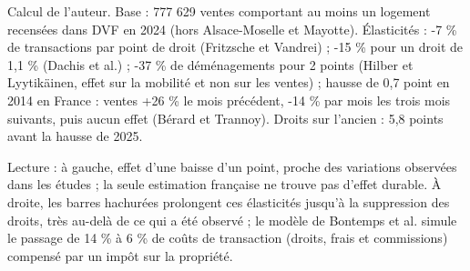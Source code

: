 Calcul de l'auteur. Base : 777 629 ventes comportant au moins un logement recensées dans DVF en 2024 (hors Alsace-Moselle et Mayotte). Élasticités : -7 \% de transactions par point de droit (Fritzsche et Vandrei) ; -15 \% pour un droit de 1,1 \% (Dachis et al.) ; -37 \% de déménagements pour 2 points (Hilber et Lyytikäinen, effet sur la mobilité et non sur les ventes) ; hausse de 0,7 point en 2014 en France : ventes +26 \% le mois précédent, -14 \% par mois les trois mois suivants, puis aucun effet (Bérard et Trannoy). Droits sur l'ancien : 5,8 points avant la hausse de 2025.\par Lecture : à gauche, effet d'une baisse d'un point, proche des variations observées dans les études ; la seule estimation française ne trouve pas d'effet durable. À droite, les barres hachurées prolongent ces élasticités jusqu'à la suppression des droits, très au-delà de ce qui a été observé ; le modèle de Bontemps et al. simule le passage de 14 \% à 6 \% de coûts de transaction (droits, frais et commissions) compensé par un impôt sur la propriété.
